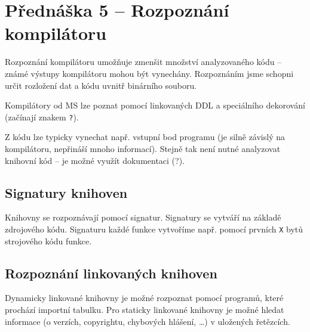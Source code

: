 \section{Přednáška 5 -- Rozpoznání kompilátoru}

Rozpoznání kompilátoru umožňuje zmenšit množství analyzovaného kódu -- známé výstupy kompilátoru mohou být vynechány.
Rozpoznáním jsme schopni určit rozložení dat a kódu uvnitř binárního souboru.

Kompilátory od MS lze poznat pomocí linkovaných DDL a speciálního dekorování (začínají znakem \texttt{?}).

Z kódu lze typicky vynechat např. vstupní bod programu (je silně závislý na kompilátoru, nepřináší mnoho informací).
Stejně tak není nutné analyzovat knihovní kód -- je možné využít dokumentaci (?).

\subsection*{Signatury knihoven}

Knihovny se rozpoznávají pomocí signatur.
Signatury se vytváří na základě zdrojového kódu.
Signaturu každé funkce vytvoříme např. pomocí prvních \texttt{X} bytů strojového kódu funkce.

\subsection*{Rozpoznání linkovaných knihoven}

Dynamicky linkované knihovny je možné rozpoznat pomocí programů, které prochází importní tabulku.
Pro staticky linkované knihovny je možné hledat informace (o verzích, copyrightu, chybových hlášení, \dots) v uložených řetězcích.
